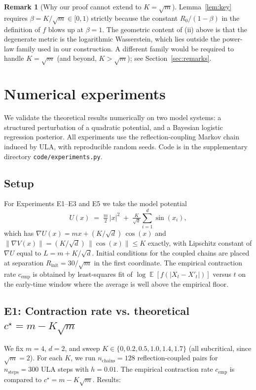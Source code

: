 \documentclass[11pt]{article}
\theoremstyle{definition}
\newtheorem{remark}[theorem]{Remark}
\DeclareMathOperator{\E}{\mathbb{E}}
\newcommand{\norm}[1]{\left\lVert #1 \right\rVert}
\newcommand{\abs}[1]{\left\lvert #1 \right\rvert}
\begin{document}
\begin{remark}[Why our proof cannot extend to $K = \sqrt m$]
Lemma~\ref{lem:key} requires $\beta = K/\sqrt m \in [0, 1)$ strictly because the constant $R_0/(1-\beta)$ in the definition of $f$ blows up at $\beta = 1$. The geometric content of (ii) above is that the degenerate metric is the logarithmic Wasserstein, which lies outside the power-law family used in our construction. A different family would be required to handle $K = \sqrt m$ (and beyond, $K > \sqrt m$); see Section~\ref{sec:remarks}.
\end{remark}

\section{Numerical experiments}\label{sec:numerics}

We validate the theoretical results numerically on two model systems: a structured perturbation of a quadratic potential, and a Bayesian logistic regression posterior. All experiments use the reflection-coupling Markov chain induced by ULA, with reproducible random seeds. Code is in the supplementary directory \texttt{code/experiments.py}.

\subsection{Setup}
For Experiments E1--E3 and E5 we take the model potential
\begin{equation}\label{eq:test-potential}
U(x) \;=\; \tfrac{m}{2}\,\abs{x}^2 \;+\; \tfrac{K}{\sqrt d}\sum_{i=1}^d \sin(x_i),
\end{equation}
which has $\nabla U(x) = m x + (K/\sqrt d)\,\cos(x)$ and $\norm{\nabla V(x)} = (K/\sqrt d)\,\norm{\cos(x)} \le K$ exactly, with Lipschitz constant of $\nabla U$ equal to $L = m + K/\sqrt d$. Initial conditions for the coupled chains are placed at separation $R_{\mathrm{init}} = 30/\sqrt m$ in the first coordinate. The empirical contraction rate $c_{\mathrm{emp}}$ is obtained by least-squares fit of $\log \E[f(\abs{X_t - X'_t})]$ versus $t$ on the early-time window where the average is well above the empirical floor.

\subsection{E1: Contraction rate vs. theoretical $c^\star = m - K\sqrt m$}
We fix $m = 4$, $d = 2$, and sweep $K \in \{0, 0.2, 0.5, 1.0, 1.4, 1.7\}$ (all subcritical, since $\sqrt m = 2$). For each $K$, we run $n_{\mathrm{chains}} = 128$ reflection-coupled pairs for $n_{\mathrm{steps}} = 300$ ULA steps with $h = 0.01$. The empirical contraction rate $c_{\mathrm{emp}}$ is compared to $c^\star = m - K\sqrt m$. Results:
\end{document}

